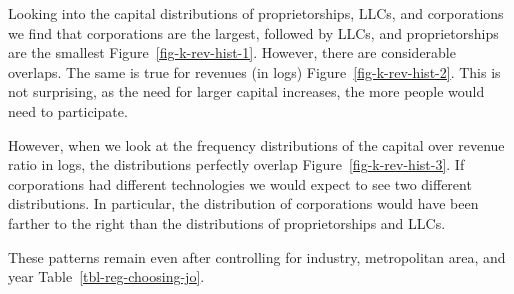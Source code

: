 \documentclass[
  12pt]{article}
\theoremstyle{definition}
\theoremstyle{remark}
\begin{document}
Looking into the capital distributions of proprietorships, LLCs, and
corporations we find that corporations are the largest, followed by
LLCs, and proprietorships are the smallest
Figure~\ref{fig-k-rev-hist-1}. However, there are considerable overlaps.
The same is true for revenues (in logs) Figure~\ref{fig-k-rev-hist-2}.
This is not surprising, as the need for larger capital increases, the
more people would need to participate.

However, when we look at the frequency distributions of the capital over
revenue ratio in logs, the distributions perfectly overlap
Figure~\ref{fig-k-rev-hist-3}. If corporations had different
technologies we would expect to see two different distributions. In
particular, the distribution of corporations would have been farther to
the right than the distributions of proprietorships and LLCs.

These patterns remain even after controlling for industry, metropolitan
area, and year Table~\ref{tbl-reg-choosing-jo}.
\end{document}
